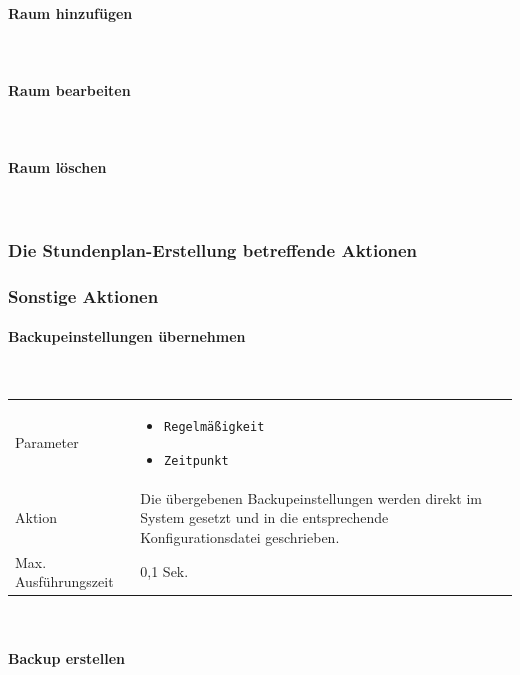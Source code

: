 \documentclass[fontsize=12pt,paper=a4,twoside]{scrartcl}
\begin{document}
\paragraph{Raum hinzufügen}\mbox{}\\

\paragraph{Raum bearbeiten}\mbox{}\\

\paragraph{Raum löschen}\mbox{}\\

\subsubsection{Die Stundenplan-Erstellung betreffende Aktionen}

\subsubsection{Sonstige Aktionen}

\paragraph{Backupeinstellungen übernehmen}\mbox{}\\

\begin{tabularx}{\textwidth}{p{4cm}X}
Parameter & \begin{itemize}[itemsep=0pt, leftmargin = 0.5cm]
			\item \texttt{Regelmäßigkeit}
			\item \texttt{Zeitpunkt}
			\end{itemize}\\
Aktion & Die übergebenen Backupeinstellungen werden direkt im System gesetzt und in die entsprechende Konfigurationsdatei geschrieben. \\
Max. Ausführungszeit & 0,1 Sek. 
\end{tabularx}\\



\paragraph{Backup erstellen}\mbox{}\\
\end{document}
